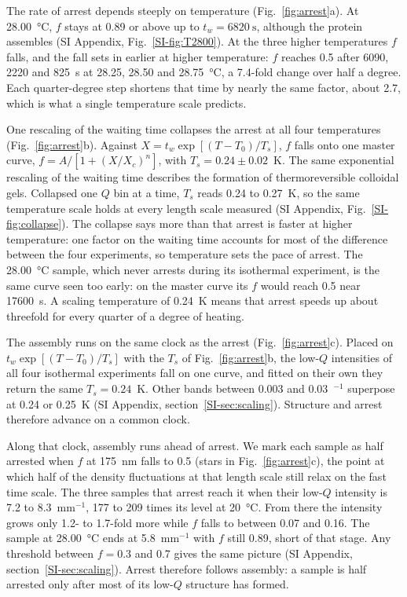 \documentclass[journal=nalefd,manuscript=letter,layout=traditional]{achemso}
\newcommand{\Ainv}{\text{\AA}$^{-1}$}
\begin{document}
The rate of arrest depends steeply on temperature (Fig.~\ref{fig:arrest}a). At \SI{28.00}{\degreeCelsius}, $f$ stays at 0.89 or above up to $t_w=\SI{6820}{\second}$, although the protein assembles (SI Appendix, Fig.~\ref*{SI-fig:T2800}). At the three higher temperatures $f$ falls, and the fall sets in earlier at higher temperature: $f$ reaches 0.5 after 6090, 2220 and \SI{825}{\second} at 28.25, 28.50 and \SI{28.75}{\degreeCelsius}, a 7.4-fold change over half a degree. Each quarter-degree step shortens that time by nearly the same factor, about 2.7, which is what a single temperature scale predicts.

One rescaling of the waiting time collapses the arrest at all four temperatures (Fig.~\ref{fig:arrest}b). Against $X=t_w\exp[(T-T_0)/T_s]$, $f$ falls onto one master curve, $f=A/[1+(X/X_c)^n]$, with $T_s=0.24\pm0.02$~K. The same exponential rescaling of the waiting time describes the formation of thermoreversible colloidal gels.\cite{Zhang2017-ip} Collapsed one $Q$ bin at a time, $T_s$ reads 0.24 to 0.27~K, so the same temperature scale holds at every length scale measured (SI Appendix, Fig.~\ref*{SI-fig:collapse}). The collapse says more than that arrest is faster at higher temperature: one factor on the waiting time accounts for most of the difference between the four experiments, so temperature sets the pace of arrest. The \SI{28.00}{\degreeCelsius} sample, which never arrests during its isothermal experiment, is the same curve seen too early: on the master curve its $f$ would reach 0.5 near \SI{17600}{\second}. A scaling temperature of 0.24~K means that arrest speeds up about threefold for every quarter of a degree of heating.

The assembly runs on the same clock as the arrest (Fig.~\ref{fig:arrest}c). Placed on $t_w\exp[(T-T_0)/T_s]$ with the $T_s$ of Fig.~\ref{fig:arrest}b, the low-$Q$ intensities of all four isothermal experiments fall on one curve, and fitted on their own they return the same $T_s=0.24$~K. Other bands between 0.003 and 0.03~\Ainv{} superpose at 0.24 or 0.25~K (SI Appendix, section~\ref*{SI-sec:scaling}). Structure and arrest therefore advance on a common clock.

Along that clock, assembly runs ahead of arrest. We mark each sample as half arrested when $f$ at \SI{175}{\nano\meter} falls to 0.5 (stars in Fig.~\ref{fig:arrest}c), the point at which half of the density fluctuations at that length scale still relax on the fast time scale. The three samples that arrest reach it when their low-$Q$ intensity is 7.2 to 8.3~mm$^{-1}$, 177 to 209 times its level at \SI{20}{\degreeCelsius}. From there the intensity grows only 1.2- to 1.7-fold more while $f$ falls to between 0.07 and 0.16. The sample at \SI{28.00}{\degreeCelsius} ends at 5.8~mm$^{-1}$ with $f$ still 0.89, short of that stage. Any threshold between $f=0.3$ and 0.7 gives the same picture (SI Appendix, section~\ref*{SI-sec:scaling}). Arrest therefore follows assembly: a sample is half arrested only after most of its low-$Q$ structure has formed.
\end{document}
